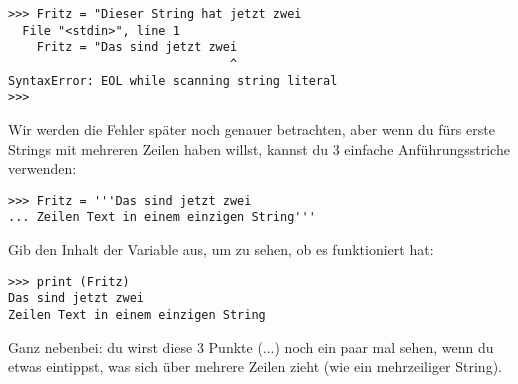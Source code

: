 \begin{Verbatim}[frame=single]
>>> Fritz = "Dieser String hat jetzt zwei
  File "<stdin>", line 1
    Fritz = "Das sind jetzt zwei
                               ^
SyntaxError: EOL while scanning string literal
>>>
\end{Verbatim}

Wir werden die Fehler später noch genauer betrachten, aber wenn du fürs erste Strings mit mehreren Zeilen haben willst, kannst du 3 einfache Anführungsstriche verwenden:

\begin{Verbatim}[frame=single]
>>> Fritz = '''Das sind jetzt zwei
... Zeilen Text in einem einzigen String'''
\end{Verbatim}

\noindent
Gib den Inhalt der Variable aus, um zu sehen, ob es funktioniert hat:

\begin{Verbatim}[frame=single]
>>> print (Fritz)
Das sind jetzt zwei
Zeilen Text in einem einzigen String
\end{Verbatim}

Ganz nebenbei: du wirst diese 3 Punkte (...) noch ein paar mal sehen, wenn du etwas eintippst, was sich über mehrere Zeilen zieht (wie ein mehrzeiliger String).


